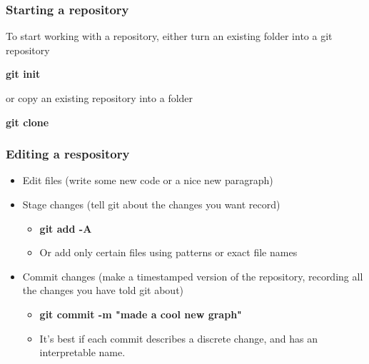 \documentclass{beamer}
\newcommand{\code}[1]{{\fontfamily{pcr}\selectfont \textbf{#1}}}
\begin{document}
\begin{frame}
\frametitle{Starting a repository}

To start working with a repository, either turn an existing folder into a git repository

\medskip

\code{git init}

\medskip

or copy an existing repository into a folder

\medskip

\code{git clone}

\end{frame}

\begin{frame}
	\frametitle{Editing a respository}
	
	\begin{itemize}
		\item<1-> Edit files (write some new code or a nice new paragraph)
		
\par\noindent\hrulefill\par
		
		\item<2-> Stage changes (tell git about the changes you want record)
		
		\begin{itemize}
			\item \code{git add -A}
			\item Or add only certain files using patterns or exact file names
		\end{itemize}
		
		\par\noindent\hrulefill\par
		
		\item<3-> Commit changes (make a timestamped version of the repository, recording all the changes you have told git about)
		\begin{itemize}
			\item \code{git commit -m "made a cool new graph"}
			\item It's best if each commit describes a discrete change, and has an interpretable name.
		\end{itemize}
		
		\par\noindent\hrulefill\par
	\end{itemize}
	
	
\end{frame}
\end{document}
